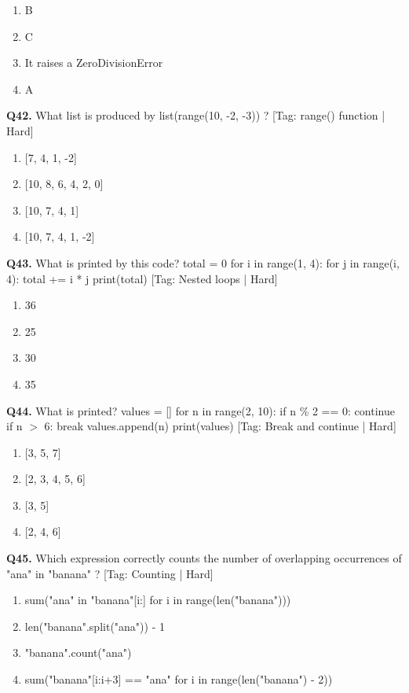 \begin{enumerate}[label=(\alph*),topsep=2pt,itemsep=1pt,partopsep=0pt,parsep=0pt]
    \item {B}
    \item {C}
    \item {It raises a ZeroDivisionError}
    \item {A}
\end{enumerate}
\vspace{2mm}
\noindent\textbf{Q42.} What list is produced by list(range(10, -2, -3)) ? \hfill [Tag: range() function | Hard]
\begin{enumerate}[label=(\alph*),topsep=2pt,itemsep=1pt,partopsep=0pt,parsep=0pt]
    \item {[7, 4, 1, -2]}
    \item {[10, 8, 6, 4, 2, 0]}
    \item {[10, 7, 4, 1]}
    \item {[10, 7, 4, 1, -2]}
\end{enumerate}
\vspace{2mm}
\noindent\textbf{Q43.} What is printed by this code? total = 0 for i in range(1, 4): for j in range(i, 4): total += i * j print(total) \hfill [Tag: Nested loops | Hard]
\begin{enumerate}[label=(\alph*),topsep=2pt,itemsep=1pt,partopsep=0pt,parsep=0pt]
    \item {36}
    \item {25}
    \item {30}
    \item {35}
\end{enumerate}
\vspace{2mm}
\noindent\textbf{Q44.} What is printed? values = [] for n in range(2, 10): if n \% 2 == 0: continue if n $>$ 6: break values.append(n) print(values) \hfill [Tag: Break and continue | Hard]
\begin{enumerate}[label=(\alph*),topsep=2pt,itemsep=1pt,partopsep=0pt,parsep=0pt]
    \item {[3, 5, 7]}
    \item {[2, 3, 4, 5, 6]}
    \item {[3, 5]}
    \item {[2, 4, 6]}
\end{enumerate}
\vspace{2mm}
\noindent\textbf{Q45.} Which expression correctly counts the number of overlapping occurrences of "ana" in "banana" ? \hfill [Tag: Counting | Hard]
\begin{enumerate}[label=(\alph*),topsep=2pt,itemsep=1pt,partopsep=0pt,parsep=0pt]
    \item {sum("ana" in "banana"[i:] for i in range(len("banana")))}
    \item {len("banana".split("ana")) - 1}
    \item {"banana".count("ana")}
    \item {sum("banana"[i:i+3] == "ana" for i in range(len("banana") - 2))}
\end{enumerate}
